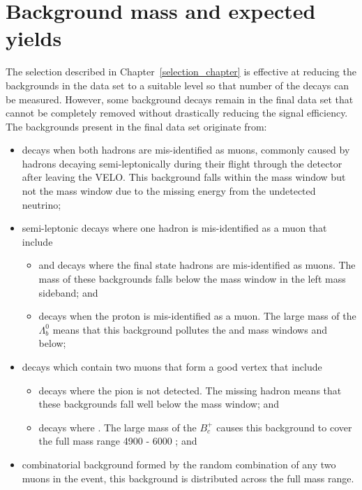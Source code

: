 
\section{Background mass \pdfs and expected yields}
\label{sec:backgrounds}
The selection described in Chapter~\ref{selection_chapter} is effective at reducing the backgrounds in the data set to a suitable level so that number of the \bmumu decays can be measured. However, some background decays remain in the final data set that cannot be completely removed without drastically reducing the signal efficiency. %
The backgrounds present in the final data set originate from:
\begin{itemize}
\item \bhh decays when both hadrons are mis-identified as muons, commonly caused by hadrons decaying semi-leptonically during their flight through the detector after leaving the VELO. This background falls within the \bd mass window but not the \bs mass window due to the missing energy from the undetected neutrino;
\item semi-leptonic decays where one hadron is mis-identified as a muon that include
\begin{itemize}
\item \bdpimunu and \bsKmunu decays where the final state hadrons are mis-identified as muons. The mass of these backgrounds falls below the \bd mass window in the left mass sideband; and
\item \lambdab decays when the proton is mis-identified as a muon. The large mass of the $\Lambda^{0}_{b}$ means that this background pollutes the \bs and \bd mass windows and below;
\end{itemize}
\item decays which contain two muons that form a good vertex that include
\begin{itemize}
\item \bpimumu decays where the pion is not detected. The missing hadron means that these backgrounds fall well below the \bd mass window; and
\item \bcjpsimunu decays where \jpsimumu. The large mass of the $B^{+}_{c}$ causes this background to cover the full mass range 4900 - 6000 \mevcc; and
\end{itemize}
\item combinatorial background formed by the random combination of any two muons in the event, this background is distributed across the full mass range.
\end{itemize}

